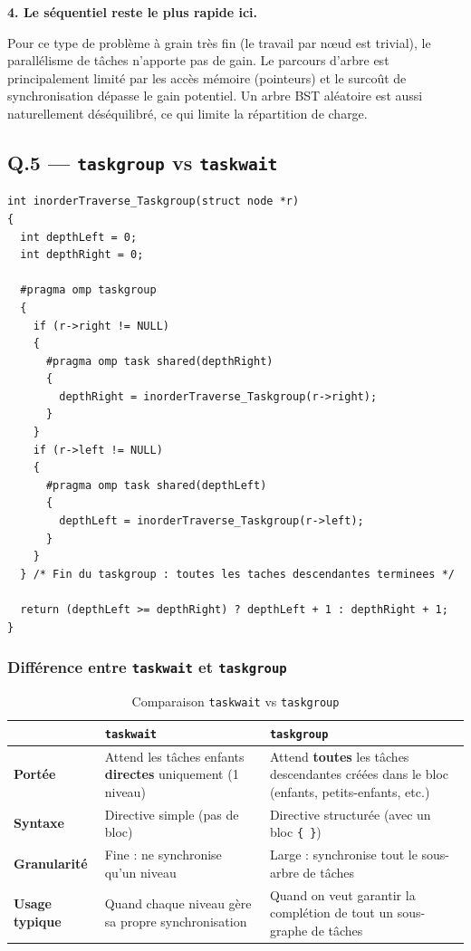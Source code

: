 \documentclass[12pt,a4paper]{article}
\begin{document}
\textbf{4. Le séquentiel reste le plus rapide ici.}

Pour ce type de problème à grain très fin (le travail par n\oe ud est trivial),
le parallélisme de tâches n'apporte pas de gain. Le parcours d'arbre est
principalement limité par les accès mémoire (pointeurs) et le surcoût de
synchronisation dépasse le gain potentiel. Un arbre BST aléatoire est aussi
naturellement déséquilibré, ce qui limite la répartition de charge.

\subsection{Q.5 --- \texttt{taskgroup} vs \texttt{taskwait}}

\begin{lstlisting}[caption={Version avec \texttt{taskgroup} --- Q.5}]
int inorderTraverse_Taskgroup(struct node *r)
{
  int depthLeft = 0;
  int depthRight = 0;

  #pragma omp taskgroup
  {
    if (r->right != NULL)
    {
      #pragma omp task shared(depthRight)
      {
        depthRight = inorderTraverse_Taskgroup(r->right);
      }
    }
    if (r->left != NULL)
    {
      #pragma omp task shared(depthLeft)
      {
        depthLeft = inorderTraverse_Taskgroup(r->left);
      }
    }
  } /* Fin du taskgroup : toutes les taches descendantes terminees */

  return (depthLeft >= depthRight) ? depthLeft + 1 : depthRight + 1;
}
\end{lstlisting}

\subsubsection{Différence entre \texttt{taskwait} et \texttt{taskgroup}}

\begin{table}[h!]
\centering
\begin{tabular}{p{2.5cm}p{5.5cm}p{5.5cm}}
\toprule
 & \textbf{\texttt{taskwait}} & \textbf{\texttt{taskgroup}} \\
\midrule
\textbf{Portée}
  & Attend les tâches enfants \textbf{directes} uniquement (1 niveau)
  & Attend \textbf{toutes} les tâches descendantes créées dans le bloc
    (enfants, petits-enfants, etc.) \\
\midrule
\textbf{Syntaxe}
  & Directive simple (pas de bloc)
  & Directive structurée (avec un bloc \texttt{\{ \}}) \\
\midrule
\textbf{Granularité}
  & Fine : ne synchronise qu'un niveau
  & Large : synchronise tout le sous-arbre de tâches \\
\midrule
\textbf{Usage typique}
  & Quand chaque niveau gère sa propre synchronisation
  & Quand on veut garantir la complétion de tout un sous-graphe de tâches \\
\bottomrule
\end{tabular}
\caption{Comparaison \texttt{taskwait} vs \texttt{taskgroup}}
\end{table}
\end{document}
